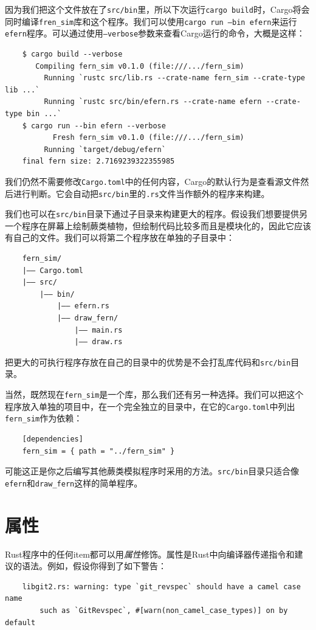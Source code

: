 因为我们把这个文件放在了\texttt{src/bin}里，所以下次运行\texttt{cargo build}时，Cargo将会同时编译\texttt{fren\_sim}库和这个程序。我们可以使用\texttt{cargo run --bin efern}来运行\texttt{efern}程序。可以通过使用\texttt{--verbose}参数来查看Cargo运行的命令，大概是这样：
\begin{verbatim}
    $ cargo build --verbose
       Compiling fern_sim v0.1.0 (file:///.../fern_sim)
         Running `rustc src/lib.rs --crate-name fern_sim --crate-type lib ...`
         Running `rustc src/bin/efern.rs --crate-name efern --crate-type bin ...`
    $ cargo run --bin efern --verbose
           Fresh fern_sim v0.1.0 (file:///.../fern_sim)
         Running `target/debug/efern`
    final fern size: 2.7169239322355985
\end{verbatim}

我们仍然不需要修改\texttt{Cargo.toml}中的任何内容，Cargo的默认行为是查看源文件然后进行判断。它会自动把\texttt{src/bin}里的\texttt{.rs}文件当作额外的程序来构建。

我们也可以在\texttt{src/bin}目录下通过子目录来构建更大的程序。假设我们想要提供另一个程序在屏幕上绘制蕨类植物，但绘制代码比较多而且是模块化的，因此它应该有自己的文件。我们可以将第二个程序放在单独的子目录中：
\begin{verbatim}
    fern_sim/
    |—— Cargo.toml
    |—— src/
        |—— bin/
            |—— efern.rs
            |—— draw_fern/
                |—— main.rs
                |—— draw.rs
\end{verbatim}

把更大的可执行程序存放在自己的目录中的优势是不会打乱库代码和\texttt{src/bin}目录。

当然，既然现在\texttt{fern\_sim}是一个库，那么我们还有另一种选择。我们可以把这个程序放入单独的项目中，在一个完全独立的目录中，在它的\texttt{Cargo.toml}中列出\texttt{fern\_sim}作为依赖：
\begin{verbatim}
    [dependencies]
    fern_sim = { path = "../fern_sim" }
\end{verbatim}

可能这正是你之后编写其他蕨类模拟程序时采用的方法。\texttt{src/bin}目录只适合像\texttt{efern}和\texttt{draw\_fern}这样的简单程序。

\section{属性}

Rust程序中的任何item都可以用\emph{属性}修饰。属性是Rust中向编译器传递指令和建议的语法。例如，假设你得到了如下警告：
\begin{verbatim}
    libgit2.rs: warning: type `git_revspec` should have a camel case name
        such as `GitRevspec`, #[warn(non_camel_case_types)] on by default
\end{verbatim}

